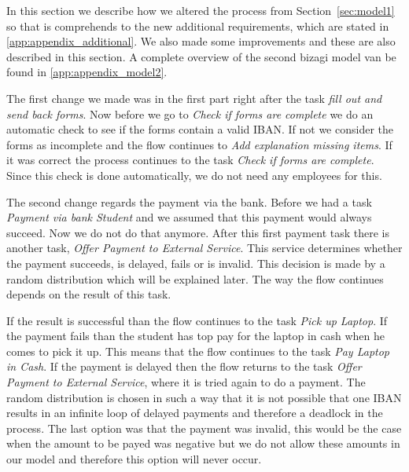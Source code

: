 
In this section we describe how we altered the process from Section~\ref{sec:model1} so that is comprehends to the new additional requirements, which are stated in \autoref{app:appendix_additional}.
We also made some improvements and these are also described in this section.
A complete overview of the second bizagi model van be found in \autoref{app:appendix_model2}.

The first change we made was in the first part right after the task \emph{fill out and send back forms}.
Now before we go to \emph{Check if forms are complete} we do an automatic check to see if the forms contain a valid IBAN.
If not we consider the forms as incomplete and the flow continues to \emph{Add explanation missing items}.
If it was correct the process continues to the task \emph{Check if forms are complete}. Since this check is done automatically, we do not need any employees for this.

The second change regards the payment via the bank. Before we had a task \emph{Payment via bank Student} and we assumed that this payment would always succeed.
Now we do not do that anymore. After this first payment task there is another task, \emph{Offer Payment to External Service}.
This service determines whether the payment succeeds, is delayed, fails or is invalid.
This decision is made by a random distribution which will be explained later.
The way the flow continues depends on the result of this task.

If the result is successful than the flow continues to the task \emph{Pick up Laptop}.
If the payment fails than the student has top pay for the laptop in cash when he comes to pick it up.
This means that the flow continues to the task \emph{Pay Laptop in Cash}.
If the payment is delayed then the flow returns to the task \emph{Offer Payment to External Service}, where it is tried again to do a payment.
The random distribution is chosen in such a way that it is not possible that one IBAN results in an infinite loop of delayed payments and therefore a deadlock in the process.
The last option was that the payment was invalid, this would be the case when the amount to be payed was negative but we do not allow these amounts in our model and therefore this option will never occur.


